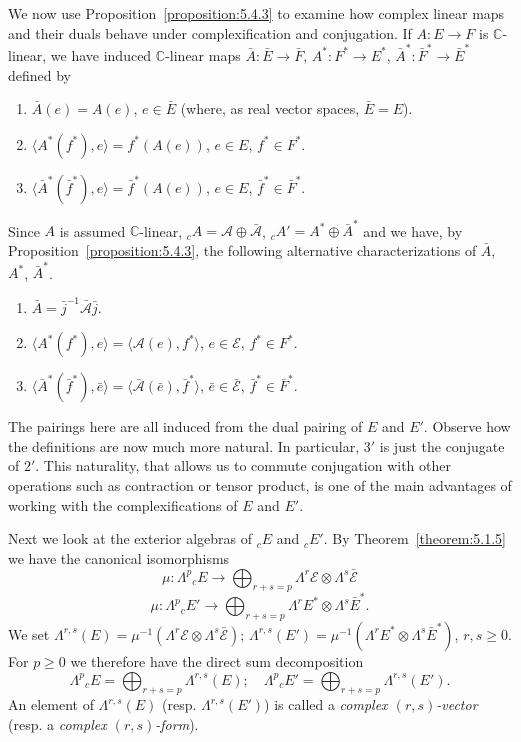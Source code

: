 We now use Proposition~\ref{proposition:5.4.3} to examine how complex linear maps and their duals behave under complexification and conjugation. If $A:E\to F$ is $\mathbb C$-linear, we have induced $\mathbb C$-linear maps $\bar A:\bar E\to\bar F$, $A^*:F^*\to E^*$, $\bar A^*:\bar F^*\to\bar E^*$ defined by
\begin{enumerate}
\item $\bar A(e)=A(e)$, $e\in\bar E$ (where, as real vector spaces, $\bar E=E$).
\item $\langle A^*(f^*),e\rangle=f^*(A(e))$, $e\in E$, $f^*\in F^*$.
\item $\langle\bar A^*(\bar f^*),e\rangle=\bar f^*(A(e))$, $e\in E$, $\bar f^*\in\bar F^*$.
\end{enumerate}
Since $A$ is assumed $\mathbb C$-linear, ${}_cA=\mathcal A\oplus\bar{\mathcal A}$, ${}_cA'=A^*\oplus\bar A^*$ and we have, by Proposition~\ref{proposition:5.4.3}, the following alternative characterizations of $\bar A$, $A^*$, $\bar A^*$.
\begin{enumerate}
\item[$1'$.] $\bar A=\bar j^{-1}\bar{\mathcal A}\bar j$.
\item[$2'$.] $\langle A^*(f^*),e\rangle=\langle\mathcal A(e),f^*\rangle$, $e\in\mathcal E$, $f^*\in F^*$.
\item[$3'$.] $\langle\bar A^*(\bar f^*),\bar e\rangle=\langle\bar{\mathcal A}(\bar e),\bar f^*\rangle$, $\bar e\in\bar{\mathcal E}$, $\bar f^*\in\bar F^*$.
\end{enumerate}
The pairings here are all induced from the dual pairing of $E$ and $E'$. Observe how the definitions are now much more natural. In particular, $3'$ is just the conjugate of $2'$. This naturality, that allows us to commute conjugation with other operations such as contraction or tensor product, is one of the main advantages of working with the complexifications of $E$ and $E'$.

Next we look at the exterior algebras of ${}_cE$ and ${}_cE'$. By Theorem~\ref{theorem:5.1.5} we have the canonical isomorphisms
\[
\mu:\Lambda^p{}_cE\longrightarrow\bigoplus_{r+s=p}\Lambda^r\mathcal E\otimes\Lambda^s\bar{\mathcal E}
\]
\[
\mu:\Lambda^p{}_cE'\longrightarrow\bigoplus_{r+s=p}\Lambda^r E^*\otimes\Lambda^s\bar E^*.
\]
We set $\Lambda^{r,s}(E)=\mu^{-1}(\Lambda^r\mathcal E\otimes\Lambda^s\bar{\mathcal E})$; $\Lambda^{r,s}(E')=\mu^{-1}(\Lambda^r E^*\otimes\Lambda^s\bar E^*)$, $r,s\geq0$. For $p\geq0$ we therefore have the direct sum decomposition
\[
\Lambda^p{}_cE=\bigoplus_{r+s=p}\Lambda^{r,s}(E);\quad\Lambda^p{}_cE'=\bigoplus_{r+s=p}\Lambda^{r,s}(E').
\]
An element of $\Lambda^{r,s}(E)$ (resp. $\Lambda^{r,s}(E')$) is called a \emph{complex $(r,s)$-vector} (resp. a \emph{complex $(r,s)$-form}).
